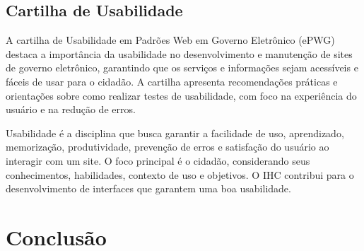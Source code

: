 \documentclass[
  12pt,
  openright,
  twoside,
  a4paper,
  english,
  french,
  spanish,
  brazil
]{abntex2}
\begin{document}
\section{Cartilha de Usabilidade}

A cartilha de Usabilidade em Padrões Web em Governo Eletrônico (ePWG) destaca a
importância da usabilidade no desenvolvimento e manutenção de sites de governo
eletrônico, garantindo que os serviços e informações sejam acessíveis e fáceis
de usar para o cidadão. A cartilha apresenta recomendações práticas e
orientações sobre como realizar testes de usabilidade, com foco na experiência
do usuário e na redução de erros.

Usabilidade é a disciplina que busca garantir a facilidade de uso, aprendizado,
memorização, produtividade, prevenção de erros e satisfação do usuário ao
interagir com um site. O foco principal é o cidadão, considerando seus
conhecimentos, habilidades, contexto de uso e objetivos. O IHC contribui para o
desenvolvimento de interfaces que garantem uma boa usabilidade.

\chapter{Conclusão}

\postextual



\printindex
\end{document}
